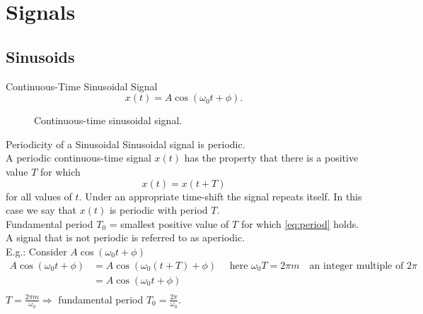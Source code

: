\section{Signals}

\subsection{Sinusoids}

\begin{frame}[plain]{Continuous-Time Sinusoidal Signal}
    \begin{equation}\label{eq:cosine}
        x(t) = A\cos(\omega_0 t + \phi).
    \end{equation}


    \begin{figure}
        \centering
        
        \caption{Continuous-time sinusoidal signal.}\label{fi:cosine}
    \end{figure}
\end{frame}

\begin{frame}[plain]{Periodicity of a Sinusoidal}
    Sinusoidal signal is \alert{periodic}.\\
    A periodic continuous-time signal $x(t)$ has the property that  there is a positive value $T$ for which
    \begin{equation}\label{eq:period}
        x(t) = x(t+T)
    \end{equation}
    for all values of $t$. Under an appropriate time-shift the signal repeats itself. In this case we say that $x(t)$ is periodic with period $T$.\\
    \alert{Fundamental period $T_0$} = smallest positive value of $T$ for which \ref{eq:period} holds.\\
    A signal that is not periodic is referred to as aperiodic. \\
    E.g.: Consider $A\cos(\omega_0t + \phi)$\\
    \begin{equation*}
        \begin{split}
            A\cos(\omega_0t + \phi) &= A\cos(\omega_0(t + T) + \phi)\quad \text{ here } \omega_0T = 2\pi m \quad \text{an integer multiple of } 2\pi\\
                                    &= A\cos(\omega_0t + \phi)\\
        \end{split}
    \end{equation*}
    $T = \frac{2\pi m}{\omega_0} \Rightarrow $ fundamental period $T_0 = \frac{2\pi}{\omega_0}$.

\end{frame}


